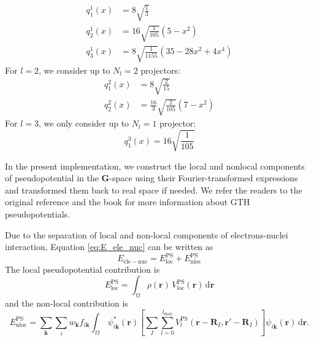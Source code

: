 \begin{align}
q^{1}_{1}(x) & = 8 \sqrt{\frac{1}{3}} \\
q^{1}_{2}(x) & = 16 \sqrt{\frac{1}{105}} (5 - x^2) \\
q^{1}_{3}(x) & = 8 \sqrt{\frac{1}{1155}} (35 - 28x^2 + 4x^4)
\end{align}
%
For $l=2$, we consider up to $N_{l}=2$ projectors:
\begin{align}
q^{2}_{1}(x) & = 8\sqrt{\frac{2}{15}} \\
q^{2}_{2}(x) & = \frac{16}{3} \sqrt{\frac{2}{105}}(7 - x^2)
\end{align}
%
For $l=3$, we only consider up to $N_{l}=1$ projector:
\begin{equation}
q^{3}_{1}(x) = 16\sqrt{\frac{1}{105}}
\end{equation}

In the present implementation, we construct the local and nonlocal
components of pseudopotential in the $\mathbf{G}$-space using
their Fourier-transformed expressions
and transformed them back to real space if needed.
We refer the readers to the original
reference \cite{Goedecker1996} and the book \cite{Marx2009}
for more information about GTH pseudopotentials.

Due to the separation of local and non-local components of electrons-nuclei
interaction, Equation \eqref{eq:E_ele_nuc} can be written as
\begin{equation}
E_{\mathrm{ele-nuc}} = E^{\mathrm{PS}}_{\mathrm{loc}}
+ E^{\mathrm{PS}}_{\mathrm{nloc}}
\end{equation}
%
The local pseudopotential contribution is
\begin{equation}
E^{\mathrm{PS}}_{\mathrm{loc}} =
\int_{\Omega} \rho(\mathbf{r})\,V^{\mathrm{PS}}_{\mathrm{loc}}(\mathbf{r})\,
\mathrm{d}\mathbf{r}
\end{equation}
%
and the non-local contribution is
\begin{equation}
E^{\mathrm{PS}}_{\mathrm{nloc}} =
\sum_{\mathbf{k}}
\sum_{i}
w_{\mathbf{k}}
f_{i\mathbf{k}}
\int_{\Omega}\,
\psi^{*}_{i\mathbf{k}}(\mathbf{r})
\left[
\sum_{I}\sum_{l=0}^{l_{\mathrm{max}}}
V^{\mathrm{PS}}_{l}(\mathbf{r}-\mathbf{R}_{I},\mathbf{r}'-\mathbf{R}_{I})
\right]
\psi_{i\mathbf{k}}(\mathbf{r})
\,\mathrm{d}\mathbf{r}.
\end{equation}
